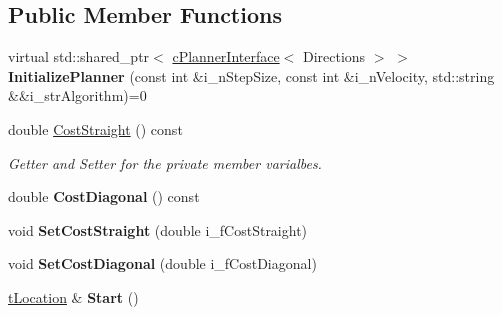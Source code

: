 \subsection*{Public Member Functions}
\begin{DoxyCompactItemize}
\item 
\mbox{\label{classplanner_1_1c_rover_interface_a7fedea18832ad850de1a2589fdca88b7}} 
virtual std\+::shared\+\_\+ptr$<$ \mbox{\hyperlink{classplanner_1_1c_planner_interface}{c\+Planner\+Interface}}$<$ Directions $>$ $>$ {\bfseries Initialize\+Planner} (const int \&i\+\_\+n\+Step\+Size, const int \&i\+\_\+n\+Velocity, std\+::string \&\&i\+\_\+str\+Algorithm)=0
\item 
\mbox{\label{classplanner_1_1c_rover_interface_ad2b552aaf43f7ce5af340d05b5657267}} 
double \mbox{\hyperlink{classplanner_1_1c_rover_interface_ad2b552aaf43f7ce5af340d05b5657267}{Cost\+Straight}} () const
\begin{DoxyCompactList}\small\item\em Getter and Setter for the private member varialbes. \end{DoxyCompactList}\item 
\mbox{\label{classplanner_1_1c_rover_interface_ab4c45b0f0c586f864a83ba90be06efd0}} 
double {\bfseries Cost\+Diagonal} () const
\item 
\mbox{\label{classplanner_1_1c_rover_interface_ac2f57f4b9bf2c01fbcf1ca3c6d1fc55d}} 
void {\bfseries Set\+Cost\+Straight} (double i\+\_\+f\+Cost\+Straight)
\item 
\mbox{\label{classplanner_1_1c_rover_interface_a3aa2779928912477dcf76c7767ea746d}} 
void {\bfseries Set\+Cost\+Diagonal} (double i\+\_\+f\+Cost\+Diagonal)
\item 
\mbox{\label{classplanner_1_1c_rover_interface_ad62c6dcbe7c8194c6a93ca1fc29ee4b8}} 
\mbox{\hyperlink{structplanner_1_1t_location}{t\+Location}} \& {\bfseries Start} ()
\item 
\mbox{\label{classplanner_1_1c_rover_interface_a29669ceb2b1f4cebf0953b59e3c8936a}} 

\end{DoxyCompactItemize}
